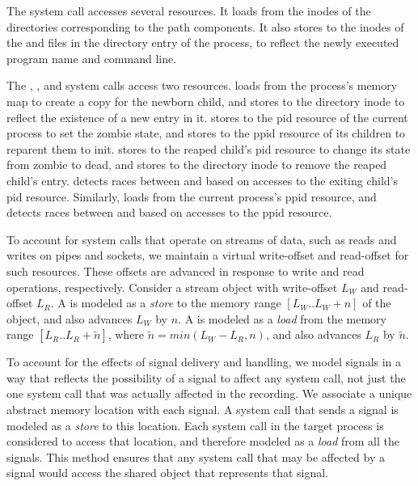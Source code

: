 The  system call accesses several resources. It loads from
the inodes of the directories corresponding to the path components. It
also stores to the inodes of the  and  files in
the  directory entry of the process, to reflect the newly
executed program name and command line.

The , , and  system calls access two
resources.   loads from the process's memory map to create a
copy for the newborn child, and stores to the  directory
inode to reflect the existence of a new entry in it.  stores
to the pid resource of the current process to set the zombie state, and
stores to the ppid resource of its children to reparent them to init.
 stores to the reaped child's pid resource to change its state
from zombie to dead, and stores to the  directory inode to
remove the reaped child's entry.  \racepro detects races between 
 and  based on accesses to the exiting child's pid
resource.  Similarly,  loads from the current process's
ppid resource, and \racepro detects races between  and 
based on accesses to the ppid resource.

To account for system calls that operate on streams of data, such as
reads and writes on pipes and sockets, we maintain a virtual
write-offset and read-offset for such resources.  These offsets are
advanced in response to write and read operations, respectively.
Consider a 
stream object with write-offset $L_W$ and read-offset $L_R$. A
 is modeled as a \emph{store} to the memory range
$[L_W..L_W+n]$ of the object, and also advances $L_W$ by $n$. A 
 is modeled as a \emph{load} from the memory range
$[L_R..L_R+\tilde{n}]$, where $\tilde{n} = min(L_W-L_R,n)$, and also 
advances $L_R$ by $\tilde{n}$.

To account for the effects of signal delivery and handling, we
model signals in a way that reflects the possibility of a signal to
affect any system call, not just the one system call that was actually
affected in the recording.  We associate a unique abstract memory  
location with each signal. A  system call that sends a signal
is modeled as a \emph{store} to this location. Each system call in
the target process is considered to access that location, and
therefore modeled as a \emph{load} from all the signals. This method 
ensures that any system call that may be affected by a signal would
access the shared object that represents that signal.

